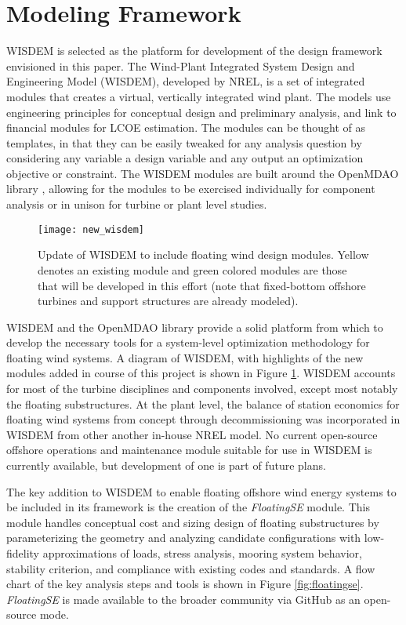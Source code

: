 \section{Modeling Framework}
WISDEM is selected as the platform for development of the design
framework envisioned in this paper.  The Wind-Plant Integrated System
Design and Engineering Model (WISDEM), developed by NREL, is a set of
integrated modules that creates a virtual, vertically integrated wind
plant. The models use engineering principles for conceptual design and
preliminary analysis, and link to financial modules for LCOE
estimation. The modules can be thought of as templates, in that they can
be easily tweaked for any analysis question by considering any variable
a design variable and any output an optimization objective or
constraint. The WISDEM modules are built around the OpenMDAO library \citep{openmdao},
allowing for the modules to be exercised individually for component
analysis or in unison for turbine or plant level studies.  

\begin{figure}[htbp]
  \begin{center}
    \texttt{[image: new\_wisdem]}\\
    \caption{Update of WISDEM to include floating wind design modules.
      Yellow denotes an existing module and green colored modules are
      those that will be developed in this effort (note that
      fixed-bottom offshore turbines and support structures are already
      modeled).}
    \label{fig:wisdem}
  \end{center}
\end{figure}

WISDEM and the OpenMDAO library provide a solid platform from which to
develop the necessary tools for a system-level optimization methodology
for floating wind systems.  A diagram of WISDEM, with highlights of the
new modules added in course of this project is shown in Figure
\ref{fig:wisdem}.  WISDEM accounts for most of the turbine disciplines
and components involved, except most notably the floating substructures.
At the plant level, the balance of station economics for floating wind
systems from concept through decommissioning was incorporated in WISDEM
from other another in-house NREL model.  No current open-source offshore
operations and maintenance module suitable for use in WISDEM is
currently available, but development of one is part of future plans.

The key addition to WISDEM to enable floating offshore wind energy
systems to be included in its framework is the creation of the
\textit{FloatingSE} module.  This module handles conceptual cost and
sizing design of floating substructures by parameterizing the geometry
and analyzing candidate configurations with low-fidelity approximations
of loads, stress analysis, mooring system behavior, stability criterion,
and compliance with existing codes and standards.  A flow chart of the
key analysis steps and tools is shown in Figure \ref{fig:floatingse}.
\textit{FloatingSE} is made available to the broader community via
GitHub as an open-source mode.

